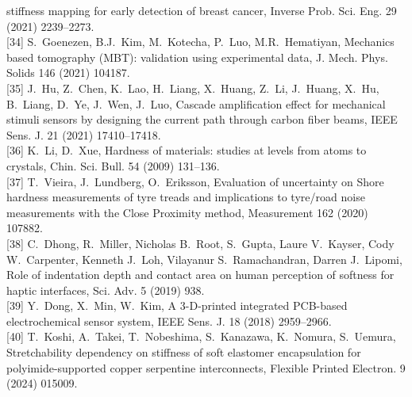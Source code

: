 \documentclass[11pt]{article}
\begin{document}
\begin{footnotesize}
stiffness mapping for early detection of breast cancer, Inverse
Prob. Sci. Eng. 29 (2021) 2239--2273.\\[2pt]
[34] S.~Goenezen, B.J.~Kim, M.~Kotecha, P.~Luo, M.R.~Hematiyan,
Mechanics based tomography (MBT): validation using experimental
data, J. Mech. Phys. Solids 146 (2021) 104187.\\[2pt]
[35] J.~Hu, Z.~Chen, K.~Lao, H.~Liang, X.~Huang, Z.~Li, J.~Huang,
X.~Hu, B.~Liang, D.~Ye, J.~Wen, J.~Luo, Cascade amplification
effect for mechanical stimuli sensors by designing the current path
through carbon fiber beams, IEEE Sens. J. 21 (2021) 17410--17418.\\[2pt]
[36] K.~Li, D.~Xue, Hardness of materials: studies at levels from
atoms to crystals, Chin. Sci. Bull. 54 (2009) 131--136.\\[2pt]
[37] T.~Vieira, J.~Lundberg, O.~Eriksson, Evaluation of uncertainty
on Shore hardness measurements of tyre treads and implications to
tyre/road noise measurements with the Close Proximity method,
Measurement 162 (2020) 107882.\\[2pt]
[38] C.~Dhong, R.~Miller, Nicholas B.~Root, S.~Gupta,
Laure V.~Kayser, Cody W.~Carpenter, Kenneth J.~Loh,
Vilayanur S.~Ramachandran, Darren J.~Lipomi, Role of indentation
depth and contact area on human perception of softness for haptic
interfaces, Sci. Adv. 5 (2019) 938.\\[2pt]
[39] Y.~Dong, X.~Min, W.~Kim, A 3-D-printed integrated PCB-based
electrochemical sensor system, IEEE Sens. J. 18 (2018) 2959--2966.\\[2pt]
[40] T.~Koshi, A.~Takei, T.~Nobeshima, S.~Kanazawa, K.~Nomura,
S.~Uemura, Stretchability dependency on stiffness of soft
elastomer encapsulation for polyimide-supported copper serpentine
interconnects, Flexible Printed Electron. 9 (2024) 015009.
\end{footnotesize}
\end{document}
